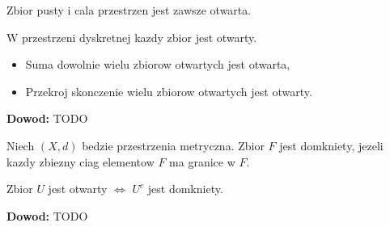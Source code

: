 \documentclass{article}
\begin{document}
Zbior pusty i cala przestrzen jest zawsze otwarta. 

W przestrzeni dyskretnej kazdy zbior jest otwarty.

\begin{tcolorbox}[colback=white!90!green,colframe=black!35!green,title=Fakt 1.8: Sumy i przekroje zbiorow otwartych.]
\begin{itemize}
    \item Suma dowolnie wielu zbiorow otwartych jest otwarta,
    \item Przekroj skonczenie wielu zbiorow otwartych jest otwarty.
\end{itemize}
\end{tcolorbox}
\textbf{Dowod:} TODO

\begin{tcolorbox}[colback=white!90!red,colframe=black!35!red,title=Definicja 1.9: Zbior domkniety.]

    Niech $(X,d)$ bedzie przestrzenia metryczna. Zbior $F$ jest domkniety, jezeli kazdy zbiezny ciag elementow $F$ ma granice w $F$.
\end{tcolorbox}

\begin{tcolorbox}[colback=white!90!green,colframe=black!35!green,title=Fakt 1.10: Zbior domkniety kiedy]
    
    Zbior $U$ jest otwarty $\iff$ $U^{c}$ jest domkniety.
\end{tcolorbox}

\textbf{Dowod:} TODO
\end{document}
